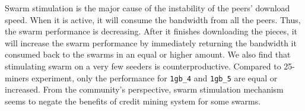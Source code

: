 Swarm stimulation is the major cause of the instability of the peers' download speed. When it is active, it will consume the bandwidth from
all the peers. Thus, the swarm performance is decreasing. After it finishes downloading the pieces, it will increase the swarm performance by immediately returning the bandwidth it consumed back to the swarms in an equal or higher amount. We also find that stimulating swarm on a very few seeders is counterproductive. Compared to 25-miners experiment, only the performance for \texttt{1gb\_4} and  \texttt{1gb\_5} are equal or increased. From the community's perspective, swarm stimulation mechanism seems to negate the benefits of credit mining system for some swarms.

